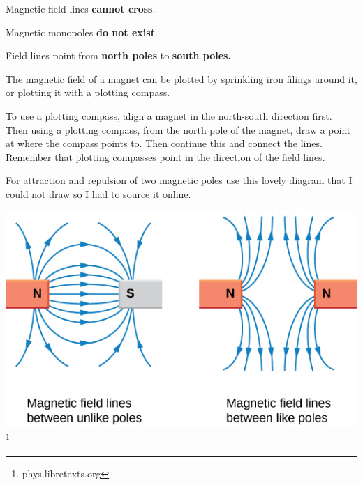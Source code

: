 \documentclass[../main.tex]{subfiles}
\begin{document}
	Magnetic field lines \textbf{cannot cross}.
	
	Magnetic monopoles \textbf{do not exist}.
	
	Field lines point from \textbf{north poles} to \textbf{south poles.}
	\begin{center}
	\end{center}
	
	The magnetic field of a magnet can be plotted by sprinkling iron filings around it, or plotting it with a plotting compass.
	
	To use a plotting compass, align a magnet in the north-south direction first. Then using a plotting compass, from the north pole of the magnet, draw a point at where the compass points to. Then continue this and connect the lines. Remember that plotting compasses point in the direction of the field lines.
	
	For attraction and repulsion of two magnetic poles use this lovely diagram that I could not draw so I had to source it online.
	\begin{center}
		\includegraphics[width=0.85\linewidth]{graphics/magnetismFieldLines}\footnote{phys.libretexts.org}
	\end{center}
\end{document}

